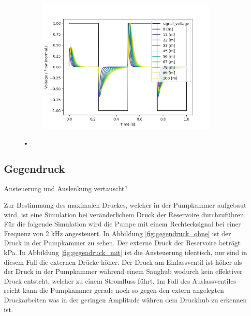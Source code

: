 \documentclass[fontsize=12pt, a4paper]{scrartcl}
\begin{document}
\begin{figure}[H]
\begin{subfigure}[H]{0.48\textwidth}
		\includegraphics[width=\textwidth, valign=t]{bilder/tubelength/tl_both_branch_multisweep_flow.png}
	\end{subfigure}
	\caption{•}
\end{figure}

\subsection{Gegendruck}

Ansteuerung und Auslenkung vertauscht?

Zur Bestimmung des maximalen Druckes, welcher in der Pumpkammer aufgebaut wird, ist eine Simulation bei veränderlichem Druck der Reservoire durchzuführen. Für die folgende Simulation wird die Pumpe mit einem Rechtecksignal bei einer Frequenz von 2 kHz angesteuert. In Abbildung \ref{fig:gegendruck_ohne} ist der Druck in der Pumpkammer zu sehen. Der externe Druck der Reservoire beträgt kPa. In Abbildung \ref{fig:gegendruck_mit} ist die Ansteuerung identisch, nur sind in diesem Fall die externen Drücke höher. Der Druck am Einlassventil ist höher als der Druck in der Pumpkammer während einem Saughub wodurch kein effektiver Druck entsteht, welcher zu einem Stromfluss führt. Im Fall des Auslassventiles reicht kann die Pumpkammer gerade noch so gegen den extern angelegten Druckarbeiten was in der geringen Amplitude währen dem Druckhub zu erkennen ist.
\end{document}
